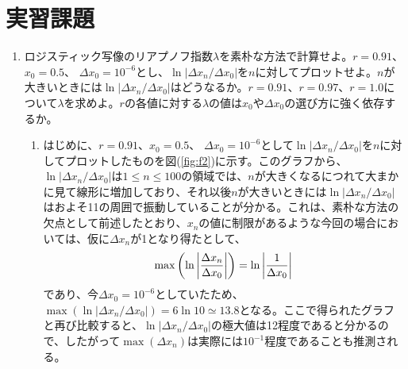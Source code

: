 \documentclass{jsarticle}
\begin{document}
    
    \section{実習課題}
    
        \begin{enumerate}
            \renewcommand{\labelenumi}{\alph{enumi}.}
            \renewcommand{\labelenumii}{}
            
            \item ロジスティック写像のリアプノフ指数$\lambda$を素朴な方法で計算せよ。$r=0.91$、$x_{0}=0.5$、 $\Delta x_{0}=10^{-6}$とし、$\ln |\Delta x_{n} / \Delta x_{0}|$を$n$に対してプロットせよ。$n$が大きいときには$\ln |\Delta x_{n} / \Delta x_{0}|$はどうなるか。$r=0.91$、$r=0.97$、$r=1.0$について$\lambda$を求めよ。$r$の各値に対する$\lambda$の値は$x_{0}$や$\Delta x_{0}$の選び方に強く依存するか。     
                
            \begin{enumerate}
                \item はじめに、$r=0.91$、$x_{0}=0.5$、 $\Delta x_{0}=10^{-6}$として$\ln |\Delta x_{n} / \Delta x_{0}|$を$n$に対してプロットしたものを図(\ref{fig:f2})に示す。このグラフから、$\ln |\Delta x_{n} / \Delta x_{0}|$は$1 \le n \le 100$の領域では、$n$が大きくなるにつれて大まかに見て線形に増加しており、それ以後$n$が大きいときには$\ln |\Delta x_{n} / \Delta x_{0}|$はおよそ11の周囲で振動していることが分かる。これは、素朴な方法の欠点として前述したとおり、$x_{n}$の値に制限があるような今回の場合においては、仮に$\Delta x_{n}$が1となり得たとして、
                \begin{equation}
                    \max \left( \ln \left| \frac{\Delta x_{n}}{\Delta x_{0}} \right| \right) = \ln \left| \frac{1}{\Delta x_{0}} \right| \\
                \end{equation}
                であり、今$\Delta x_{0} = 10^{-6}$としていたため、$\max ( \ln | \Delta x_{n} / \Delta x_{0} | ) = 6 \ln 10 \simeq 13.8 $となる。ここで得られたグラフと再び比較すると、$\ln | \Delta x_{n} / \Delta x_{0} |$の極大値は12程度であると分かるので、したがって$\max ( \Delta x_{n} ) $は実際には$10^{-1}$程度であることも推測される。
                

\end{enumerate}
\end{enumerate}
\end{document}
